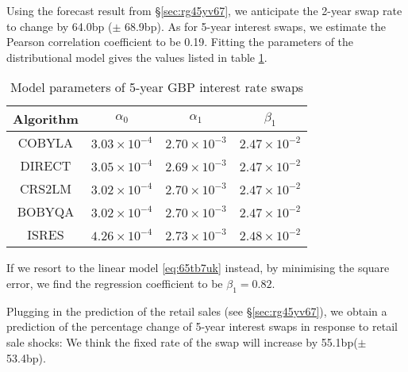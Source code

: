 \documentclass[a4paper,11pt,pdftex,twoside,titlepage]{article}
\begin{document}
Using the forecast result from \S\ref{sec:rg45yv67}, we anticipate the
2-year swap rate to change by 64.0bp ($\pm$ 68.9bp).
As for 5-year interest swaps, we estimate the Pearson correlation
coefficient to be 0.19. Fitting the parameters of the distributional
model gives the values listed in table \ref{tab:g536yu67}.
\begin{table}[htb!]
  \centering
  \begin{tabular}{c|c|c|c}
    Algorithm & $\alpha_0$ & $\alpha_1$ & $\beta_1$ \\
    \hline
    COBYLA & $3.03 \times 10^{-4}$ & $2.70 \times 10^{-3}$ & $2.47 \times 10^{-2}$ \\
    DIRECT & $3.05 \times 10^{-4}$ & $2.69 \times 10^{-3}$ & $2.47 \times 10^{-2}$ \\
    CRS2LM & $3.02 \times 10^{-4}$ & $2.70 \times 10^{-3}$ & $2.47 \times 10^{-2}$ \\
    BOBYQA & $3.02 \times 10^{-4}$ & $2.70 \times 10^{-3}$ & $2.47 \times 10^{-2}$ \\
    ISRES & $4.26 \times 10^{-4}$ & $2.73 \times 10^{-3}$ & $2.48 \times 10^{-2}$ \\
    \hline
  \end{tabular}
  \caption{Model parameters of 5-year GBP interest rate swaps}
  \label{tab:g536yu67}
\end{table}
If we resort to the linear model \eqref{eq:65tb7uk} instead, by minimising the
square error, we find the regression coefficient to be $\beta_1 = 0.82$.

Plugging in the prediction of the retail sales (see
\S\ref{sec:rg45yv67}), we obtain a prediction of the percentage change
of 5-year interest swaps in response to retail sale shocks: We think
the fixed rate of the swap will increase by 55.1bp($\pm$ 53.4bp).
\end{document}
